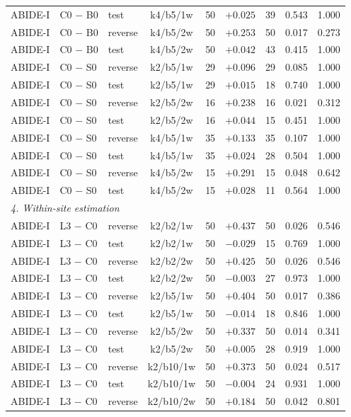 \begin{longtable}{lllcrrrrr}
ABIDE-I & C0 $-$ B0 & test & k4/b5/1w & 50 & $+0.025$ & 39 & 0.543 & 1.000\\
ABIDE-I & C0 $-$ B0 & reverse & k4/b5/2w & 50 & $+0.253$ & 50 & 0.017 & 0.273\\
ABIDE-I & C0 $-$ B0 & test & k4/b5/2w & 50 & $+0.042$ & 43 & 0.415 & 1.000\\
ABIDE-I & C0 $-$ S0 & reverse & k2/b5/1w & 29 & $+0.096$ & 29 & 0.085 & 1.000\\
ABIDE-I & C0 $-$ S0 & test & k2/b5/1w & 29 & $+0.015$ & 18 & 0.740 & 1.000\\
ABIDE-I & C0 $-$ S0 & reverse & k2/b5/2w & 16 & $+0.238$ & 16 & 0.021 & 0.312\\
ABIDE-I & C0 $-$ S0 & test & k2/b5/2w & 16 & $+0.044$ & 15 & 0.451 & 1.000\\
ABIDE-I & C0 $-$ S0 & reverse & k4/b5/1w & 35 & $+0.133$ & 35 & 0.107 & 1.000\\
ABIDE-I & C0 $-$ S0 & test & k4/b5/1w & 35 & $+0.024$ & 28 & 0.504 & 1.000\\
ABIDE-I & C0 $-$ S0 & reverse & k4/b5/2w & 15 & $+0.291$ & 15 & 0.048 & 0.642\\
ABIDE-I & C0 $-$ S0 & test & k4/b5/2w & 15 & $+0.028$ & 11 & 0.564 & 1.000\\
\multicolumn{9}{l}{\textit{4. Within-site estimation}}\\
ABIDE-I & L3 $-$ C0 & reverse & k2/b2/1w & 50 & $+0.437$ & 50 & 0.026 & 0.546\\
ABIDE-I & L3 $-$ C0 & test & k2/b2/1w & 50 & $-0.029$ & 15 & 0.769 & 1.000\\
ABIDE-I & L3 $-$ C0 & reverse & k2/b2/2w & 50 & $+0.425$ & 50 & 0.026 & 0.546\\
ABIDE-I & L3 $-$ C0 & test & k2/b2/2w & 50 & $-0.003$ & 27 & 0.973 & 1.000\\
ABIDE-I & L3 $-$ C0 & reverse & k2/b5/1w & 50 & $+0.404$ & 50 & 0.017 & 0.386\\
ABIDE-I & L3 $-$ C0 & test & k2/b5/1w & 50 & $-0.014$ & 18 & 0.846 & 1.000\\
ABIDE-I & L3 $-$ C0 & reverse & k2/b5/2w & 50 & $+0.337$ & 50 & 0.014 & 0.341\\
ABIDE-I & L3 $-$ C0 & test & k2/b5/2w & 50 & $+0.005$ & 28 & 0.919 & 1.000\\
ABIDE-I & L3 $-$ C0 & reverse & k2/b10/1w & 50 & $+0.373$ & 50 & 0.024 & 0.517\\
ABIDE-I & L3 $-$ C0 & test & k2/b10/1w & 50 & $-0.004$ & 24 & 0.931 & 1.000\\
ABIDE-I & L3 $-$ C0 & reverse & k2/b10/2w & 50 & $+0.184$ & 50 & 0.042 & 0.801\\

\end{longtable}

